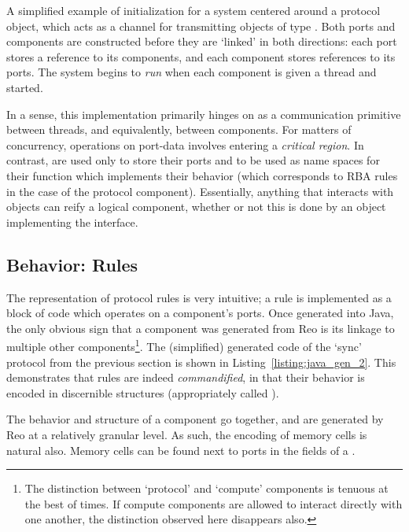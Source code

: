 \begin{listing}[ht]
	\centering
	\inputminted[]{java}{java_gen_1.java}
	\caption[Reo-generated Java protocol initialization.]{A simplified example of initialization for a system centered around a  protocol object, which acts as a channel for transmitting objects of type . Both ports and components are constructed before they are `linked' in both directions: each port stores a reference to its components, and each component stores references to its ports. The system begins to \textit{run} when each component is given a thread and started.}
	\label{listing:java_gen_1}
\end{listing}


In a sense, this implementation primarily hinges on  as a communication primitive between threads, and equivalently, between components. For matters of concurrency, operations on port-data involves entering a \textit{critical region}. In contrast,  are used only to store their ports and to be used as name spaces for their  function which implements their behavior (which corresponds to RBA rules in the case of the protocol component). Essentially, anything that interacts with  objects can reify a logical component, whether or not this is done by an object implementing the  interface.

\subsection{Behavior: Rules}
The representation of protocol rules is very intuitive; a rule is implemented as a block of code which operates on a component's ports. Once generated into Java, the only obvious sign that a component was generated from Reo is its linkage to multiple other components\footnote{The distinction between `protocol' and `compute' components is tenuous at the best of times. If compute components are allowed to interact directly with one another, the distinction observed here disappears also.}. The (simplified) generated  code of the `sync' protocol from the previous section is shown in Listing~\ref{listing:java_gen_2}. This demonstrates that rules are indeed \textit{commandified}, in that their behavior is encoded in discernible structures (appropriately called ).

The behavior and structure of a component go together, and are generated by Reo at a relatively granular level. As such, the encoding of memory cells is natural also. Memory cells can be found next to ports in the fields of a .

